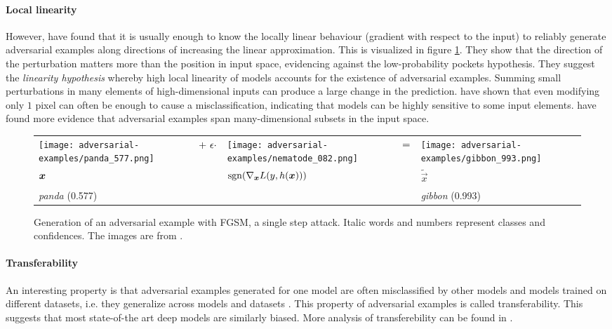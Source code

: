 \documentclass[oneside]{book}
\begin{document}
\paragraph{Local linearity} However, \citet{Goodfellow:2014:EHAE} have found that it is usually enough to know the locally linear behaviour (gradient with respect to the input) to reliably generate adversarial examples along directions of increasing the linear approximation. This is visualized in figure \ref{fig:fgsm-adversarial-example}. They show that the direction of the perturbation matters more than the position in input space, evidencing against the low-probability pockets hypothesis. They suggest the \textit{linearity hypothesis} whereby high local linearity of models accounts for the existence of adversarial examples. Summing small perturbations in many elements of high-dimensional inputs can produce a large change in the prediction. \citet{Su:2017:OPAFDNN} have shown that even modifying only $1$ pixel can often be enough to cause a misclassification, indicating that models can be highly sensitive to some input elements. \citet{Tabacof:2016:ESAI} have found more evidence that adversarial examples span many-dimensional subsets in the input space.


\begin{figure}[htbp!]
	\centering
	{\small
		\begin{tabular}{>{\centering\arraybackslash}m{}m{.1in}>{\centering\arraybackslash}m{}m{.05in}>{\centering\arraybackslash}m{}}
			\centering\arraybackslash
			\texttt{[image: adversarial-examples/panda\_577.png]} &%
			\centering\arraybackslash%
			$\centering +\ \epsilon \cdot$ &%
			\texttt{[image: adversarial-examples/nematode\_082.png]} &%
			$\centering =$ & %
			\texttt{[image: adversarial-examples/gibbon\_993.png]} \\
			$\centering \vec x$     &%
			& $\sgn\del{\nabla_{\vec x} L(y,h(\vec x))}$ & & $\tilde{\vec x}$ \\
			\emph{panda} (0.577) & & & & \emph{gibbon} (0.993) 
		\end{tabular}
	}
	\caption{Generation of an adversarial example with FGSM, a single step attack. Italic words and numbers represent classes and confidences. The images are from \citet{Goodfellow:2014:EHAE}.}
	\label{fig:fgsm-adversarial-example}
\end{figure}

\paragraph{Transferability} An interesting property is that adversarial examples generated for one model are often misclassified by other models and models trained on different datasets, i.e. they generalize across models and datasets \citep{Szegedy:2013:IPNN}. This property of adversarial examples is called transferability. This suggests that most state-of-the art deep models are similarly biased. More analysis of transferebility can be found in \citet{Papernot:2016:TMLPBBAAS,Liu:2016:DTAEBBA,Tramer:2017:STAE}. 
\end{document}
